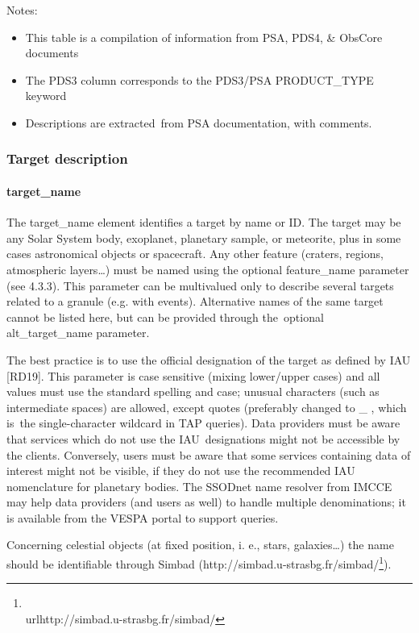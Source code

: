 \documentclass[11pt,a4paper]{ivoa}
\begin{document}
Notes:

\begin{itemize}
\item This table is a compilation of information from PSA, PDS4, \& ObsCore documents
\item The PDS3 column corresponds to the PDS3/PSA PRODUCT\_TYPE keyword
\item Descriptions are extracted from PSA documentation, with comments.
\end{itemize}

\subsubsection{Target description}

\paragraph{target\_name}

The target\_name element identifies a target by name or ID. The target may be any Solar System body, exoplanet, planetary sample, or meteorite, plus in some cases astronomical objects or spacecraft. Any other feature (craters, regions, atmospheric layers…) must be named using the optional feature\_name parameter (see 4.3.3). This parameter can be multivalued only to describe several targets related to a granule (e.g. with events). Alternative names of the same target cannot be listed here, but can be provided through the optional alt\_target\_name parameter. 

The best practice is to use the official designation of the target as defined by IAU [RD19]. This parameter is case sensitive (mixing lower/upper cases) and all values must use the standard spelling and case; unusual characters (such as intermediate spaces) are allowed, except quotes (preferably changed to \_ , which is the single-character wildcard in TAP queries). Data providers must be aware that services which do not use the IAU designations might not be accessible by the clients. Conversely, users must be aware that some services containing data of interest might not be visible, if they do not use the recommended IAU nomenclature for planetary bodies. The SSODnet name resolver from IMCCE may help data providers (and users as well) to handle multiple denominations; it is available from the VESPA portal to support queries.

Concerning celestial objects (at fixed position, i. e., stars, galaxies…) the name should be identifiable through Simbad (http://simbad.u-strasbg.fr/simbad/\footnote{\\url{http://simbad.u-strasbg.fr/simbad/}}).
\end{document}
